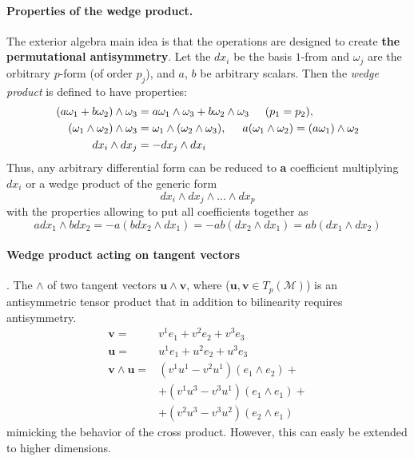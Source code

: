 {    \paragraph{Properties of the wedge product.} The exterior algebra main idea is that the operations are designed to create \textbf{the permutational antisymmetry}. 
    Let the $dx_i$ be the basis $1$-from and $\omega_j$ are the orbitrary $p$-form (of order $p_j$), and $a$, $b$ be arbitrary scalars. 
    Then the \textit{wedge product} is defined to have properties:
    \begin{align}
        (a\omega_1+b\omega_2)\wedge\omega_3 &= a\omega_1\wedge\omega_3+b\omega_2\wedge\omega_3 \hspace{5mm} (p_1 = p_2), \\
        (\omega_1\wedge\omega_2)\wedge\omega_3 &= \omega_1\wedge(\omega_2\wedge\omega_3), \hspace{5mm} a(\omega_1\wedge\omega_2) =  (a\omega_1)\wedge\omega_2\\
        dx_i\wedge dx_j &= -dx_j\wedge dx_i
    \end{align}
    Thus, any arbitrary differential form can be reduced to \textbf{a} coefficient multiplying $dx_i$ or a wedge product of the generic form 
    \begin{equation}
        dx_i\wedge dx_j \wedge...\wedge dx_p
    \end{equation}
    with the properties allowing to put all coefficients together as 
    \begin{equation}
        a dx_1 \wedge b dx_2 = - a(b dx_2 \wedge dx_1) = -ab(dx_2 \wedge dx_1) = ab(dx_1 \wedge dx_2)
    \end{equation}
    
    \paragraph{Wedge product acting on tangent vectors}.
    The $\wedge$ of two tangent vectors $\boldsymbol{u}\wedge\boldsymbol{v}$, where ($\boldsymbol{u}, \boldsymbol{v}\in T_p(\mathcal{M})$) is an antisymmetric tensor product that in addition to bilinearity requires antisymmetry. 
    \begin{align}
        \boldsymbol{v} =& v^1e_1 + v^2 e_2 + v^3 e_3 \\
        \boldsymbol{u} =& u^1e_1 + u^2 e_2 + u^3 e_3 \\
        \boldsymbol{v}\wedge\boldsymbol{u} =& (v^1u^1 - v^2u^1)(e_1\wedge e_2) + \\
        & + (v^1u^3 - v^3u^1)(e_1\wedge e_1) + \\
        & + (v^2u^3 - v^3u^2)(e_2\wedge e_1)
    \end{align}
    mimicking the behavior of the cross product. 
    However, this can easly be extended to higher dimensions. 
    
}
